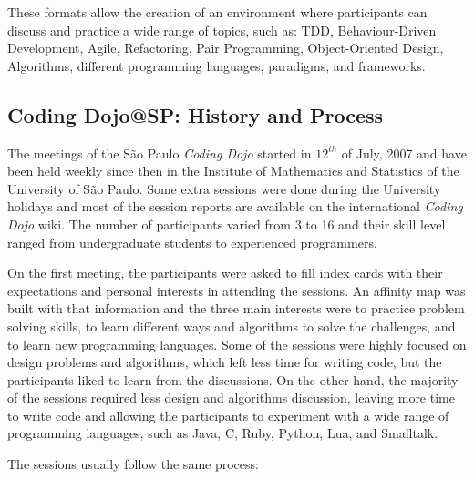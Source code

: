 These formats allow the creation of an environment where participants can discuss and
practice a wide range of topics, such as: TDD, Behaviour-Driven Development, Agile, Refactoring, Pair Programming,
Object-Oriented Design, Algorithms, different programming languages, paradigms, and frameworks.

\subsection{Coding Dojo@SP: History and Process}\label{subsec:dojosp}

The meetings of the São Paulo \emph{Coding Dojo} started in $12^{th}$ of July, 2007 and have been held weekly
since then in the Institute of Mathematics and Statistics of the University of São Paulo. Some extra sessions were
done during the University holidays and most of the session reports are available on the international
\emph{Coding Dojo} wiki\cite{DojoWiki}. The number of participants varied from 3 to 16 and their skill level ranged
from undergraduate students to experienced programmers.

On the first meeting, the participants were asked to fill index cards with their expectations and personal
interests in attending the sessions. An affinity map was built with that information and the three main interests
were to practice problem solving skills, to learn different ways and algorithms to solve the challenges, and to
learn new programming languages. Some of the sessions were highly focused on design problems and algorithms, which
left less time for writing code, but the participants liked to learn from the discussions. On the other hand, the
majority of the sessions required less design and algorithms discussion, leaving more time to write code and
allowing the participants to experiment with a wide range of programming languages, such as Java, C, Ruby, Python,
Lua, and Smalltalk.

The sessions usually follow the same process:

